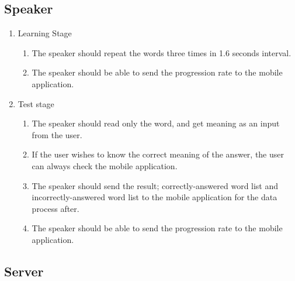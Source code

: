 \documentclass[conference]{IEEEtran}
\begin{document}
\subsection{Speaker}    
\begin{enumerate}
\item Learning Stage
    \begin{enumerate}
    \item The speaker should repeat the words three times in 1.6 seconds interval.
    \item The speaker should be able to send the progression rate to the mobile application.
    \end{enumerate}
\item Test stage
    \begin{enumerate}
    \item The speaker should read only the word, and get meaning as an input from the user.
    \item If the user wishes to know the correct meaning of the answer, the user can always check the mobile application.
    \item The speaker should send the result; correctly-answered word list and incorrectly-answered word list to the mobile application for the data process after.
    \item The speaker should be able to send the progression rate to the mobile application.
    \end{enumerate}
\end{enumerate}

\subsection{Server}    
\end{document}

